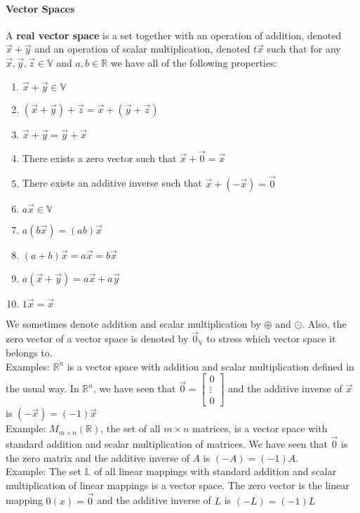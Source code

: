 \documentclass[10pt,letter]{article}
\begin{document}
\paragraph{Vector Spaces} A \textbf{real vector space} is a set together with an operation of addition, denoted $\vec{x}+\vec{y}$ and an operation of scalar multiplication, denoted $t\vec{x}$ such that for any $\vec{x},\vec{y},\vec{z}\in\mathbb{V}$ and $a,b\in\mathbb{R}$ we have all of the following properties: \begin{enumerate}
    \item $\vec{x}+\vec{y}\in\mathbb{V}$ 
    \item $(\vec{x}+\vec{y})+\vec{z}=\vec{x}+(\vec{y}+\vec{z})$ 
    \item $\vec{x}+\vec{y}=\vec{y}+\vec{x}$ 
    \item There exists a zero vector such that $\vec{x}+\vec{0}=\vec{x}$ 
    \item There exists an additive inverse such that $\vec{x}+(-\vec{x})=\vec{0}$ 
    \item $a\vec{x}\in\mathbb{V}$ 
    \item $a(b\vec{x})=(ab)\vec{x}$ 
    \item $(a+b)\vec{x}=a\vec{x}=b\vec{x}$ 
    \item $a(\vec{x}+\vec{y})=a\vec{x}+a\vec{y}$ 
    \item $1\vec{x}=\vec{x}$
\end{enumerate}
We sometimes denote addition and scalar multiplication by $\oplus$ and $\odot$. Also, the zero vector of a vector space is denoted by $\vec{0}_\mathbb{V}$ to stress which vector space it belongs to. \\ 
Examples: $\mathbb{R}^n$ is a vector space with addition and scalar multiplication defined in the usual way. In $\mathbb{R}^n$, we have seen that $\vec{0}=\begin{bmatrix}0\\\vdots\\0\end{bmatrix}$ and the additive inverse of $\vec{x}$ is $(-\vec{x})=(-1)\vec{x}$ \\ 
Example: $M_{m\times n}(\mathbb{R})$, the set of all $m\times n$ matrices, is a vector space with standard addition and scalar multiplication of matrices. We have seen that $\vec{0}$ is the zero matrix and the additive inverse of $A$ is $(-A)=(-1)A$. \\ 
Example: The set $\mathbb{L}$ of all linear mappings with standard addition and scalar multiplication of linear mappings is a vector space. The zero vector is the linear mapping $0(x)=\vec{0}$ and the additive inverse of $L$ is $(-L)=(-1)L$ \\ 
\end{document}

